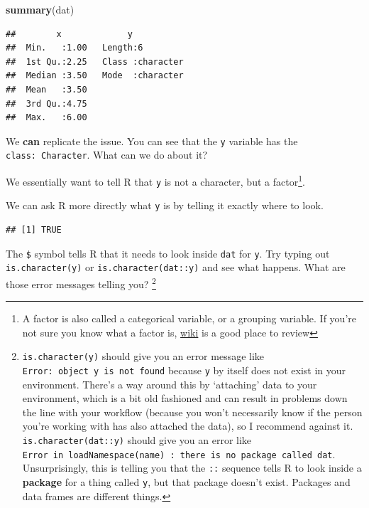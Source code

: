 \documentclass[
]{book}
\newenvironment{Shaded}{\begin{snugshade}}{\end{snugshade}}
\newcommand{\KeywordTok}[1]{\textcolor[rgb]{0.13,0.29,0.53}{\textbf{#1}}}
\newcommand{\NormalTok}[1]{#1}
\newcommand{\OperatorTok}[1]{\textcolor[rgb]{0.81,0.36,0.00}{\textbf{#1}}}
\begin{document}
\begin{Shaded}
\begin{Highlighting}[]
\KeywordTok{summary}\NormalTok{(dat)}
\end{Highlighting}
\end{Shaded}

\begin{verbatim}
##        x             y            
##  Min.   :1.00   Length:6          
##  1st Qu.:2.25   Class :character  
##  Median :3.50   Mode  :character  
##  Mean   :3.50                     
##  3rd Qu.:4.75                     
##  Max.   :6.00
\end{verbatim}

We \textbf{can} replicate the issue. You can see that the \texttt{y} variable has the \texttt{class:\ Character}. What can we do about it?

We essentially want to tell R that \texttt{y} is not a character, but a factor\footnote{A factor is also called a categorical variable, or a grouping variable. If you're not sure you know what a factor is, \href{https://en.wikipedia.org/wiki/Categorical_variable}{wiki} is a good place to review}.

We can ask R more directly what \texttt{y} is by telling it exactly where to look.

\begin{Shaded}
\end{Shaded}

\begin{verbatim}
## [1] TRUE
\end{verbatim}

The \texttt{\$} symbol tells R that it needs to look inside \texttt{dat} for \texttt{y}. Try typing out \texttt{is.character(y)} or \texttt{is.character(dat::y)} and see what happens. What are those error messages telling you? \footnote{\texttt{is.character(y)} should give you an error message like \texttt{Error:\ object\ \textquotesingle{}y\textquotesingle{}\ is\ not\ found} because \texttt{y} by itself does not exist in your environment. There's a way around this by `attaching' data to your environment, which is a bit old fashioned and can result in problems down the line with your workflow (because you won't necessarily know if the person you're working with has also attached the data), so I recommend against it. \texttt{is.character(dat::y)} should give you an error like \texttt{Error\ in\ loadNamespace(name)\ :\ there\ is\ no\ package\ called\ \textquotesingle{}dat\textquotesingle{}}. Unsurprisingly, this is telling you that the \texttt{::} sequence tells R to look inside a \textbf{package} for a thing called \texttt{y}, but that package doesn't exist. Packages and data frames are different things.}
\end{document}
